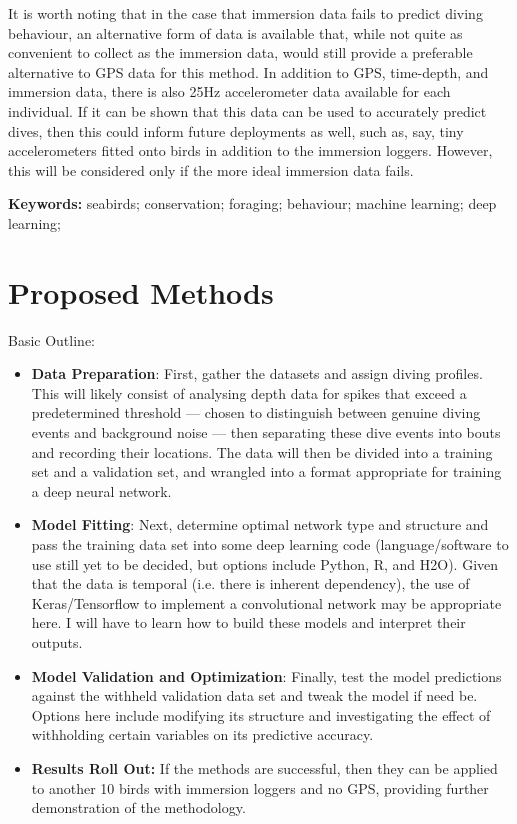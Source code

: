 \documentclass[11pt]{article}
\begin{document}
\begin{onehalfspace}
    It is worth noting that in the case that immersion data fails to predict diving behaviour, an alternative form of data is available that, while not quite as convenient to collect as the immersion data, would still provide a preferable alternative to GPS data for this method. In addition to GPS, time-depth, and immersion data, there is also 25Hz accelerometer data available for each individual. If it can be shown that this data can be used to accurately predict dives, then this could inform future deployments as well, such as, say, tiny accelerometers fitted onto birds in addition to the immersion loggers. However, this will be considered only if the more ideal immersion data fails.

  \vspace{\baselineskip} 
  \textbf{Keywords:} seabirds; conservation; foraging; behaviour; machine learning; deep learning; 
  
  \section{Proposed Methods}
    Basic Outline:

    \begin{itemize}
      \item \textbf{Data Preparation}: First, gather the datasets and assign diving profiles. This will likely consist of analysing depth data for spikes that exceed a predetermined threshold — chosen to distinguish between genuine diving events and background noise — then separating these dive events into bouts and recording their locations. The data will then be divided into a training set and a validation set, and wrangled into a format appropriate for training a deep neural network. 
      \item \textbf{Model Fitting}: Next, determine optimal network type and structure and pass the training data set into some deep learning code (language/software to use still yet to be decided, but options include Python, R, and H2O). Given that the data is temporal (i.e. there is inherent dependency), the use of Keras/Tensorflow to implement a convolutional network may be appropriate here. I will have to learn how to build these models and interpret their outputs. 
      \item \textbf{Model Validation and Optimization}: Finally, test the model predictions against the withheld validation data set and tweak the model if need be. Options here include modifying its structure and investigating the effect of withholding certain variables on its predictive accuracy.
      \item \textbf{Results Roll Out:} If the methods are successful, then they can be applied to another 10 birds with immersion loggers and no GPS, providing further demonstration of the methodology. 
    \end{itemize}


\end{onehalfspace}
\end{document}
